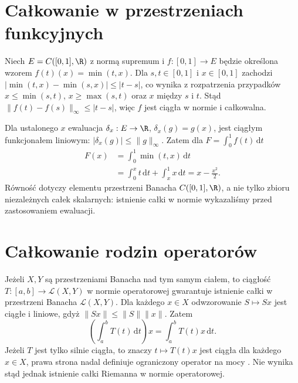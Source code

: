 \section{Całkowanie w przestrzeniach funkcyjnych}

\begin{przyklad}
\label{ma2:ex:vector-integral-function-space}
Niech $E=C([0,1],\R)$ z normą supremum
i $f:[0,1]\to E$ będzie określona wzorem
$f(t)(x)=\min(t,x)$.
Dla $s,t\in[0,1]$ i $x\in[0,1]$
zachodzi $|\min(t,x)-\min(s,x)|\le|t-s|$,
co wynika z rozpatrzenia przypadków
$x\le\min(s,t)$, $x\ge\max(s,t)$
oraz $x$ między $s$ i $t$.
Stąd $\|f(t)-f(s)\|_\infty\le|t-s|$,
więc $f$ jest ciągła w normie i całkowalna.

Dla ustalonego $x$ ewaluacja
$\delta_x:E\to\R$, $\delta_x(g)=g(x)$,
jest ciągłym funkcjonałem liniowym:
$|\delta_x(g)|\le\|g\|_\infty$.
Zatem dla $F=\int_0^1 f(t)\,\mathrm dt$
\[
 \begin{aligned}
 F(x)&=\int_0^1 \min(t,x)\,\mathrm dt\\
 &=\int_0^x t\,\mathrm dt+\int_x^1 x\,\mathrm dt
 =x-\frac{x^2}{2}.
 \end{aligned}
\]
Równość dotyczy elementu przestrzeni Banacha
$C([0,1],\R)$, a nie tylko zbioru niezależnych
całek skalarnych: istnienie całki w normie
wykazaliśmy przed zastosowaniem ewaluacji.
\end{przyklad}

\section{Całkowanie rodzin operatorów}

Jeżeli $X,Y$ są przestrzeniami Banacha nad tym samym
ciałem, to ciągłość $T:[a,b]\to\mathcal L(X,Y)$
w normie operatorowej gwarantuje istnienie
całki w przestrzeni Banacha $\mathcal L(X,Y)$.
Dla każdego $x\in X$ odwzorowanie
$S\mapsto Sx$ jest ciągłe i liniowe, gdyż
$\|Sx\|\le\|S\|\|x\|$. Zatem
\[
 \left(\int_a^b T(t)\,\mathrm dt\right)x
 =\int_a^b T(t)x\,\mathrm dt.
\]
Jeżeli $T$ jest tylko silnie ciągła, to znaczy
$t\mapsto T(t)x$ jest ciągła dla każdego
$x\in X$, prawa strona nadal definiuje
ograniczony operator na mocy
.
Nie wynika stąd jednak istnienie całki
Riemanna w normie operatorowej.


